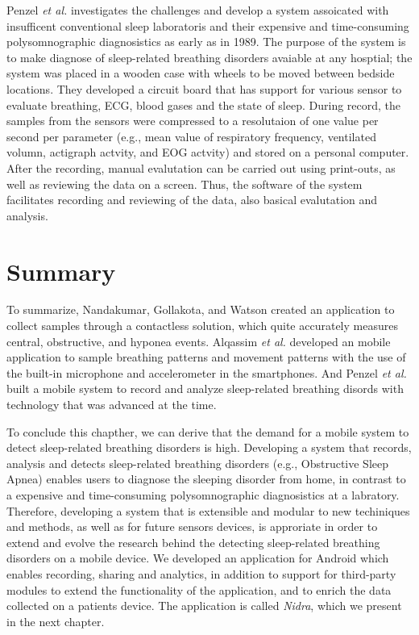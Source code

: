 Penzel \textit{et al.} \cite{mobilesleeplab} investigates the challenges and develop a system assoicated with insufficent conventional sleep laboratoris and their expensive and time-consuming polysomnographic diagnosistics as early as in 1989. The purpose of the system is to make diagnose of sleep-related breathing disorders avaiable at any hosptial; the system was placed in a wooden case with wheels to be moved between bedside locations. They developed a circuit board that has support for various sensor to evaluate breathing, ECG, blood gases and the state of sleep. During record, the samples from the sensors were compressed to a resolutaion of one value per second per parameter (e.g., mean value of respiratory frequency, ventilated volumn, actigraph actvity, and EOG actvity) and stored on a personal computer. After the recording, manual evalutation can be carried out using print-outs, as well as reviewing the data on a screen. Thus, the software of the system facilitates recording and reviewing of the data, also basical evalutation and analysis. 

\section{Summary}

To summarize, Nandakumar, Gollakota, and Watson created an application to collect samples through a contactless solution, which quite accurately measures central, obstructive, and hyponea events. Alqassim \textit{et al.} developed an mobile application to sample breathing patterns and movement patterns with the use of the built-in microphone and accelerometer in the smartphones. And Penzel \textit{et al.} built a mobile system to record and analyze sleep-related breathing disords with technology that was advanced at the time.

To conclude this chapther, we can derive that the demand for a mobile system to detect sleep-related breathing disorders is high. Developing a system that records, analysis and detects sleep-related breathing disorders (e.g., Obstructive Sleep Apnea) enables users to diagnose the sleeping disorder from home, in contrast to a expensive and time-consuming polysomnographic diagnosistics at a labratory. Therefore, developing a system that is extensible and modular to new techiniques and methods, as well as for future sensors devices, is approriate in order to extend and evolve the research behind the detecting sleep-related breathing disorders on a mobile device. We developed an application for Android which enables recording, sharing and analytics, in addition to support for third-party modules to extend the functionality of the application, and to enrich the data collected on a patients device. The application is called \textit{Nidra}, which we present in the next chapter. 
